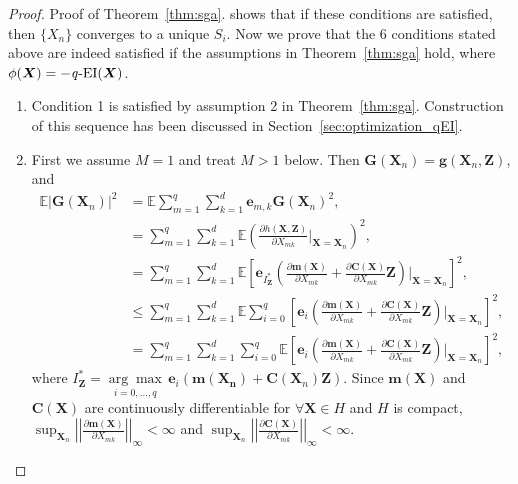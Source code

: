 \documentclass[paper=letter]{scrartcl}
\newcommand{\E}{\mathbb{E}}
\newcommand{\qEI}{\text{\textit q-EI}}
\begin{document}
\begin{proof}{Proof of Theorem~\ref{thm:sga}.}
  \cite{kushner2003stochastic} shows that if these conditions are satisfied, then $\{X_n\}$ converges to a unique $S_i$.
  Now we prove that the 6 conditions stated above are indeed satisfied if the assumptions in Theorem~\ref{thm:sga} hold, where $\phi(\bm{X}) = -\qEI(\bm{X})$.
  \begin{enumerate}
    \item 
      Condition 1 is satisfied by assumption 2 in Theorem~\ref{thm:sga}.
      Construction of this sequence has been discussed in Section~\ref{sec:optimization_qEI}.
    \item
      First we assume $M=1$ and treat $M>1$ below. Then $\bm{G}(\bm{X}_n) = \bm{g}(\bm{X}_n, \bm{Z})$, and
      \begin{equation*}
        \begin{split}
          \E \vert\bm{G}(\bm{X}_n) \vert^2 &= \E \sum_{m=1}^q \sum_{k=1}^d \bm{e}_{m,k} \bm{G}(\bm{X}_n)^2, \\
          &= \sum_{m=1}^q \sum_{k=1}^d \E \left( \frac{\partial h(\bm{X}, \bm{Z})}{\partial X_{mk}} \bigg\vert_{\bm{X} = \bm{X}_n} \right)^2, \\
          &= \sum_{m=1}^q \sum_{k=1}^d \E \left[ \bm{e}_{I^*_{\bm{Z}}} \left( \frac{\partial \bm{m}(\bm{X})}{\partial X_{mk}} + \frac{\partial \bm{C}(\bm{X})}{\partial X_{mk}} \bm{Z} \right) \bigg\vert_{\bm{X} = \bm{X}_n} \right]^2, \\
          &\leq \sum_{m=1}^q \sum_{k=1}^d \E \sum_{i=0}^q \left[ \bm{e}_i \left( \frac{\partial \bm{m}(\bm{X})}{\partial X_{mk}} + \frac{\partial \bm{C}(\bm{X})}{\partial X_{mk}} \bm{Z} \right) \bigg\vert_{\bm{X} = \bm{X}_n} \right]^2, \\
          & = \sum_{m=1}^q \sum_{k=1}^d \sum_{i=0}^q \E \left[ \bm{e}_i \left( \frac{\partial \bm{m}(\bm{X})}{\partial X_{mk}} + \frac{\partial \bm{C}(\bm{X})}{\partial X_{mk}} \bm{Z} \right) \bigg\vert_{\bm{X} = \bm{X}_n} \right]^2,
        \end{split}
        \label{}
      \end{equation*}
      where $I^*_{\bm{Z}} = \underset{i=0, \ldots, q}{\arg\max} \,\bm{e}_i \left( \bm{m}(\bm{X_n}) + \bm{C}(\bm{X}_n)\bm{Z} \right)$. 
      Since $\bm{m}(\bm{X})$ and $\bm{C}(\bm{X})$ are continuously differentiable for 
      $\forall \bm{X} \in H$ and $H$ is compact, 
      $\sup_{\bm{X}_n} \left\vert\left\vert \frac{\partial \bm{m}(\bm{X})}{\partial X_{mk}} \right\vert\right\vert_{\infty} < \infty$ 
      and $\sup_{\bm{X}_n} \left\vert\left\vert \frac{\partial \bm{C}(\bm{X})}{\partial X_{mk}} \right\vert\right\vert_{\infty} < \infty$. 

\end{enumerate}
\end{proof}
\end{document}
